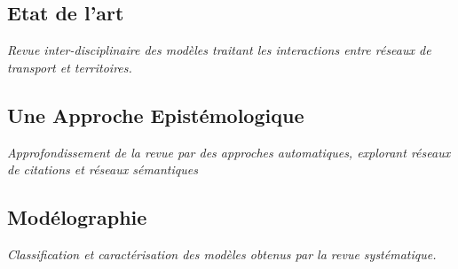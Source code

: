 
\subsection{Etat de l'art}

\textit{Revue inter-disciplinaire des modèles traitant les interactions entre réseaux de transport et territoires.}


\subsection{Une Approche Epistémologique}









\textit{Approfondissement de la revue par des approches automatiques, explorant réseaux de citations et réseaux sémantiques}



\subsection{Modélographie}

\textit{Classification et caractérisation des modèles obtenus par la revue systématique.}

